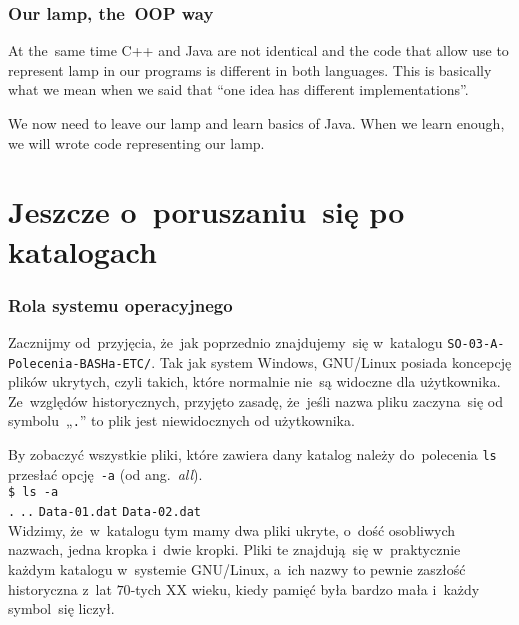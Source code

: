 \documentclass[10pt,t]{beamer}
\begin{document}
\begin{frame}
  \frametitle{Our lamp, the~OOP way}


  At the~same time C++ and Java are not identical and the code that
  allow use to represent lamp in our programs is different in both
  languages. This is basically what we mean when we said that ``one idea
  has different implementations''.

  We now need to leave our lamp and learn basics of Java. When we learn
  enough, we will wrote code representing our lamp.

\end{frame}










\section{Jeszcze o~poruszaniu~się po katalogach}


\begin{frame}
  \frametitle{Rola systemu operacyjnego}


  Zacznijmy od~przyjęcia, że~jak poprzednio znajdujemy~się w~katalogu
  \texttt{SO-03-A-Polecenia-BASHa-ETC/}. Tak jak system Windows,
  GNU/Linux posiada koncepcję plików ukrytych, czyli takich, które
  normalnie nie~są widoczne dla użytkownika. Ze~względów historycznych,
  przyjęto zasadę, że~jeśli nazwa pliku zaczyna~się od symbolu~„\texttt{.}”
  to plik jest niewidocznych od użytkownika.

  By zobaczyć wszystkie pliki, które zawiera dany katalog należy
  do~polecenia \texttt{ls} przesłać opcję~\texttt{-a}
  (od ang.~\textit{all}). \\
  \texttt{\$ ls -a} \\
  \texttt{.} \quad \texttt{..} \quad \texttt{Data-01.dat} \quad
  \texttt{Data-02.dat} \quad {} \\
  Widzimy, że~w~katalogu tym mamy dwa pliki ukryte, o~dość osobliwych
  nazwach, jedna kropka i~dwie kropki. Pliki te znajdują~się w~praktycznie
  każdym katalogu w~systemie GNU/Linux, a~ich nazwy to pewnie zaszłość
  historyczna z~lat $70$-tych XX wieku, kiedy pamięć była bardzo mała
  i~każdy symbol~się liczył.

\end{frame}
\end{document}
